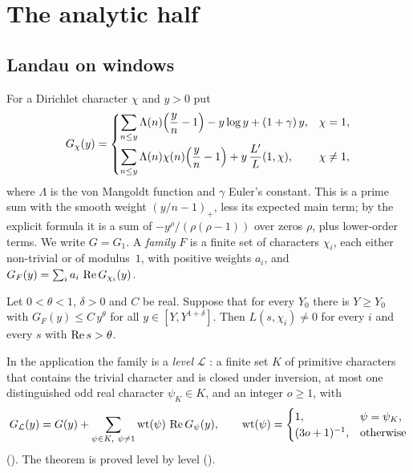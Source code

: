 \section{The analytic half}\label{sec:analytic}

\subsection{Landau on windows}\label{sec:landau}
For a Dirichlet character $\chi$ and $y>0$ put \lvS
\begin{equation}\label{eq:G}
G_\chi(y)=
\begin{cases}
\displaystyle\sum_{n\le y}\Lambda(n)\Bigl(\frac yn-1\Bigr)-y\log y+(1+\gamma)\,y, & \chi=1,\\[1.2em]
\displaystyle\sum_{n\le y}\Lambda(n)\chi(n)\Bigl(\frac yn-1\Bigr)+y\,\frac{L'}{L}(1,\chi), & \chi\neq1,
\end{cases}
\end{equation}
where $\Lambda$ is the von Mangoldt function and $\gamma$ Euler's constant. This is a prime
sum with the smooth weight $(y/n-1)_+$, less its expected main term; by the explicit formula
\cite{montgomery2007multiplicative}
it is a sum of $-y^{\rho}/(\rho(\rho-1))$ over zeros $\rho$, plus lower-order terms. We write
$G=G_1$. A \emph{family} $F$ is a finite set of characters $\chi_i$, each either non-trivial or
of modulus~$1$, with positive weights $a_i$, and
$G_F(y)=\sum_i a_i\,\operatorname{Re} G_{\chi_i}(y)$.

\begin{statement}\label{st:landau}
Let $0<\theta<1$, $\delta>0$ and $C$ be real. Suppose that for every $Y_0$ there is $Y\ge Y_0$
with $G_F(y)\le C\,y^{\theta}$ for all $y\in[Y,Y^{1+\delta}]$. Then $L(s,\chi_i)\neq0$ for
every $i$ and every $s$ with $\operatorname{Re} s>\theta$.
\end{statement}

In the application the family is a \emph{level} $\mathcal L$ \lvS: a finite set $K$ of primitive
characters that contains the trivial character and is closed under inversion, at most one
distinguished odd real character $\psi_K\in K$, and an integer $o\ge1$, with
\begin{equation}\label{eq:level}
G_{\mathcal L}(y)=G(y)+\sum_{\psi\in K,\ \psi\neq1}\mathrm{wt}(\psi)\,\re G_\psi(y),\qquad
\mathrm{wt}(\psi)=\begin{cases}1,&\psi=\psi_K,\\ (3o+1)^{-1},&\text{otherwise}\end{cases}
\end{equation}
(). The theorem is proved level by level ().

